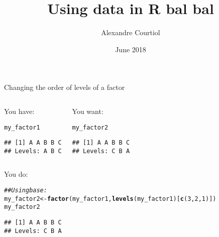 \documentclass[xcolor=dvipsnames, aspectratio=1610, 9pt]{beamer}\usepackage[]{graphicx}\usepackage[]{color}
\title{Using data in R bal bal}
\author[Alexandre Courtiol]{Alexandre Courtiol}
\institute[IZW]{Leibniz Institute of Zoo and Wildlife Research}%
\date[June 2018]{\small June 2018}%
\makeatletter
\newcommand{\hlnum}[1]{\textcolor[rgb]{0.686,0.059,0.569}{#1}}%
\newcommand{\hlcom}[1]{\textcolor[rgb]{0.678,0.584,0.686}{\textit{#1}}}%
\newcommand{\hlstd}[1]{\textcolor[rgb]{0.345,0.345,0.345}{#1}}%
\newcommand{\hlkwb}[1]{\textcolor[rgb]{0.69,0.353,0.396}{#1}}%
\newcommand{\hlkwd}[1]{\textcolor[rgb]{0.737,0.353,0.396}{\textbf{#1}}}%
\newenvironment{kframe}{%
 \def\at@end@of@kframe{}%
 \ifinner\ifhmode%
  \def\at@end@of@kframe{\end{minipage}}%
  \begin{minipage}{\columnwidth}%
 \fi\fi%
 \def\FrameCommand##1{\hskip\@totalleftmargin \hskip-\fboxsep
 \colorbox{shadecolor}{##1}\hskip-\fboxsep
     \hskip-\linewidth \hskip-\@totalleftmargin \hskip\columnwidth}%
 \MakeFramed {\advance\hsize-\width
   \@totalleftmargin\z@ \linewidth\hsize
   \@setminipage}}%
 {\par\unskip\endMakeFramed%
 \at@end@of@kframe}
\newenvironment{knitrout}{}{} %
\makeatother
\begin{document}
\setlength{\topsep}{1pt}%


\maketitle


\begin{frame}[containsverbatim]{Changing the order of levels of a factor}


\begin{columns}
\begin{center}
You have:
\begin{knitrout}\scriptsize
{}\color{fgcolor}\begin{kframe}
\begin{alltt}
\hlstd{my_factor1}
\end{alltt}
\begin{verbatim}
## [1] A A B B C
## Levels: A B C
\end{verbatim}
\end{kframe}
\end{knitrout}
\end{center}

\begin{center}
You want:
\begin{knitrout}\scriptsize
{}\color{fgcolor}\begin{kframe}
\begin{alltt}
\hlstd{my_factor2}
\end{alltt}
\begin{verbatim}
## [1] A A B B C
## Levels: C B A
\end{verbatim}
\end{kframe}
\end{knitrout}
\end{center}
\end{columns}

\begin{columns}

\begin{center}
You do:
\begin{knitrout}\scriptsize
{}\color{fgcolor}\begin{kframe}
\begin{alltt}
\hlcom{## Using base:}
\hlstd{my_factor2} \hlkwb{<-} \hlkwd{factor}\hlstd{(my_factor1,} \hlkwd{levels}\hlstd{(my_factor1)[}\hlkwd{c}\hlstd{(}\hlnum{3}\hlstd{,} \hlnum{2}\hlstd{,} \hlnum{1}\hlstd{)])}
\hlstd{my_factor2}
\end{alltt}
\begin{verbatim}
## [1] A A B B C
## Levels: C B A
\end{verbatim}
\end{kframe}
\end{knitrout}


\end{center}
\end{columns}
\end{frame}
\end{document}
